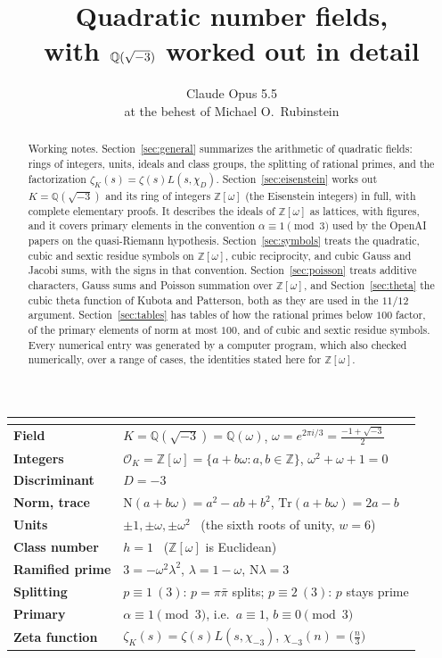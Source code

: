 \documentclass[11pt]{article}
\title{Quadratic number fields,\\ with $\Q(\sqrt{-3})$ worked out in detail}
\author{Claude Opus 5.5\\[1ex]{\normalsize at the behest of Michael O.\ Rubinstein}}
\date{}
\numberwithin{equation}{section}
\newcommand{\N}{\mathrm N}
\newcommand{\Tr}{\mathrm{Tr}}
\newcommand{\OO}{\mathbb Z[\omega]}
\newcommand{\Q}{\mathbb Q}
\newcommand{\Z}{\mathbb Z}
\newcommand{\ch}{\chi_{-3}}
\newcommand{\OK}{\mathcal O_K}
\theoremstyle{definition}
\theoremstyle{remark}
\begin{document}
\maketitle

\begin{abstract}
Working notes. Section~\ref{sec:general} summarizes the arithmetic of quadratic fields:
rings of integers, units, ideals and class groups, the splitting of rational primes, and
the factorization $\zeta_K(s)=\zeta(s)L(s,\chi_D)$. Section~\ref{sec:eisenstein} works
out $K=\Q(\sqrt{-3})$ and its ring of integers $\OO$ (the Eisenstein integers) in full,
with complete elementary proofs. It describes the ideals of $\OO$ as lattices, with figures, and it covers primary elements in the convention $\alpha\equiv1\pmod
3$ used by the OpenAI papers on the quasi-Riemann hypothesis. Section~\ref{sec:symbols}
treats the quadratic, cubic and sextic residue symbols on $\OO$, cubic reciprocity, and
cubic Gauss and Jacobi sums, with the signs in that convention. Section~\ref{sec:poisson} treats additive
characters, Gauss sums and Poisson summation over $\OO$, and Section~\ref{sec:theta} the cubic theta function of
Kubota and Patterson, both as they are used in the $11/12$ argument. Section~\ref{sec:tables}
has tables of how the rational primes below $100$ factor, of the primary elements of norm
at most $100$, and of cubic and sextic residue symbols. Every numerical entry was generated by a
computer program, which also checked numerically, over a range of cases, the identities
stated here for $\OO$.
\end{abstract}

\begin{center}
\renewcommand{\arraystretch}{1.25}
\begin{tabular}{@{}>{\bfseries}l l@{}}
\toprule
\multicolumn{2}{@{}l}{\textbf{$\Q(\sqrt{-3})$ at a glance}}\\\midrule
Field & $K=\Q(\sqrt{-3})=\Q(\omega)$, \quad $\omega=e^{2\pi i/3}=\tfrac{-1+\sqrt{-3}}2$\\
Integers & $\OK=\OO=\{a+b\omega:a,b\in\Z\}$, \quad $\omega^2+\omega+1=0$\\
Discriminant & $D=-3$\\
Norm, trace & $\N(a+b\omega)=a^2-ab+b^2$, \quad $\Tr(a+b\omega)=2a-b$\\
Units & $\pm1,\pm\omega,\pm\omega^2$ \ (the sixth roots of unity, $w=6$)\\
Class number & $h=1$ \ ($\OO$ is Euclidean)\\
Ramified prime & $3=-\omega^2\lambda^2$, \quad $\lambda=1-\omega$, \quad $\N\lambda=3$\\
Splitting & $p\equiv1\ (3)$: $p=\pi\bar\pi$ splits; \quad $p\equiv2\ (3)$: $p$ stays prime\\
Primary & $\alpha\equiv1\pmod 3$, i.e.\ $a\equiv1$, $b\equiv0\pmod3$\\
Zeta function & $\zeta_K(s)=\zeta(s)L(s,\ch)$, \quad $\ch(n)=\bigl(\tfrac n3\bigr)$\\
\bottomrule
\end{tabular}
\end{center}
\end{document}
